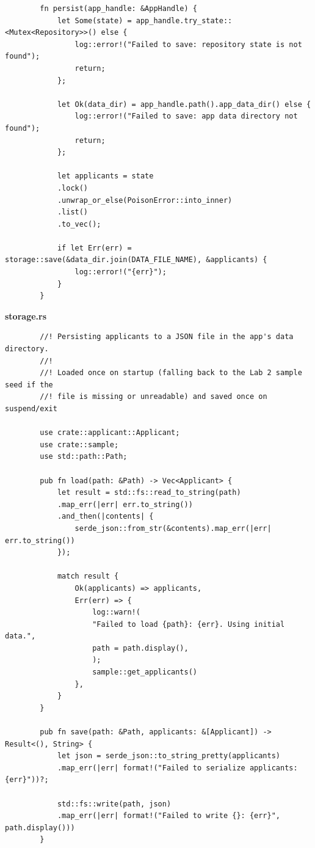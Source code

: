 \documentclass[14pt, a4paper]{extreport}
\begin{document}
\begin{verbatim}
		fn persist(app_handle: &AppHandle) {
			let Some(state) = app_handle.try_state::<Mutex<Repository>>() else {
				log::error!("Failed to save: repository state is not found");
				return;
			};
			
			let Ok(data_dir) = app_handle.path().app_data_dir() else {
				log::error!("Failed to save: app data directory not found");
				return;
			};
			
			let applicants = state
			.lock()
			.unwrap_or_else(PoisonError::into_inner)
			.list()
			.to_vec();
			
			if let Err(err) = storage::save(&data_dir.join(DATA_FILE_NAME), &applicants) {
				log::error!("{err}");
			}
		}
	\end{verbatim}
	
	\textbf{storage.rs}
	
	\begin{verbatim}
		//! Persisting applicants to a JSON file in the app's data directory.
		//!
		//! Loaded once on startup (falling back to the Lab 2 sample seed if the
		//! file is missing or unreadable) and saved once on suspend/exit
		
		use crate::applicant::Applicant;
		use crate::sample;
		use std::path::Path;
		
		pub fn load(path: &Path) -> Vec<Applicant> {
			let result = std::fs::read_to_string(path)
			.map_err(|err| err.to_string())
			.and_then(|contents| {
				serde_json::from_str(&contents).map_err(|err| err.to_string())
			});
			
			match result {
				Ok(applicants) => applicants,
				Err(err) => {
					log::warn!(
					"Failed to load {path}: {err}. Using initial data.",
					path = path.display(),
					);
					sample::get_applicants()
				},
			}
		}
		
		pub fn save(path: &Path, applicants: &[Applicant]) -> Result<(), String> {
			let json = serde_json::to_string_pretty(applicants)
			.map_err(|err| format!("Failed to serialize applicants: {err}"))?;
			
			std::fs::write(path, json)
			.map_err(|err| format!("Failed to write {}: {err}", path.display()))
		}
	\end{verbatim}
\end{document}

